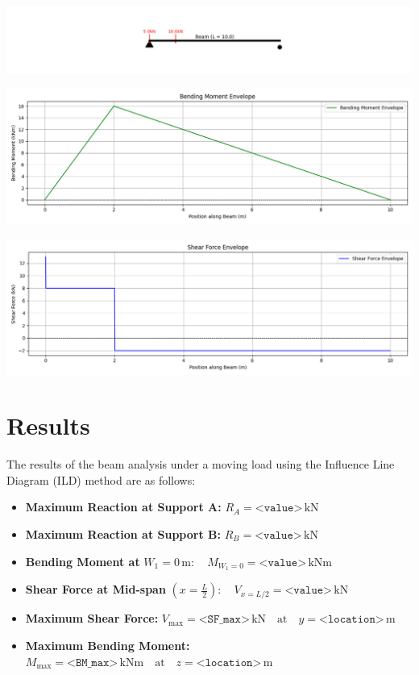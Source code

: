 \documentclass[12pt,a4paper]{article}
\begin{document}
\begin{center}
    \includegraphics[width=1.5\textwidth]{Figure_2.png}
    
    \vspace{1em}
    
    \includegraphics[width=1.0\textwidth]{Figure_11.png}

    \vspace{1em}

    \includegraphics[width=1.0\textwidth]{Figure_1.png}

\end{center}

\section*{Results}

The results of the beam analysis under a moving load using the Influence Line Diagram (ILD) method are as follows:

\begin{itemize}
    \item \textbf{Maximum Reaction at Support A:} $R_A = \texttt{<value>} \, \text{kN}$
    \item \textbf{Maximum Reaction at Support B:} $R_B = \texttt{<value>} \, \text{kN}$
    \item \textbf{Bending Moment at } $W_1 = 0 \, \text{m}: \quad M_{W_1=0} = \texttt{<value>} \, \text{kNm}$
    \item \textbf{Shear Force at Mid-span} $\left(x = \frac{L}{2}\right): \quad V_{x = L/2} = \texttt{<value>} \, \text{kN}$
    \item \textbf{Maximum Shear Force:} $V_{\text{max}} = \texttt{<SF\_max>} \, \text{kN} \quad \text{at} \quad y = \texttt{<location>} \, \text{m}$
    \item \textbf{Maximum Bending Moment:} $M_{\text{max}} = \texttt{<BM\_max>} \, \text{kNm} \quad \text{at} \quad z = \texttt{<location>} \, \text{m}$
\end{itemize}
\end{document}
